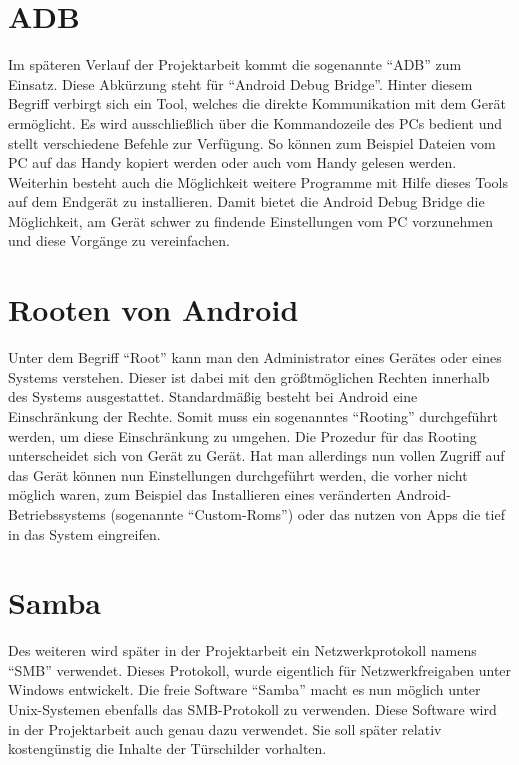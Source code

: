 \begin{flushleft}
\section{ADB}
Im späteren Verlauf der Projektarbeit kommt die sogenannte ``ADB'' zum Einsatz. Diese Abkürzung steht für ``Android Debug Bridge''. Hinter diesem Begriff verbirgt sich ein Tool, welches die direkte Kommunikation mit dem Gerät ermöglicht. Es wird ausschließlich über die Kommandozeile des PCs bedient und stellt verschiedene Befehle zur Verfügung. So können zum Beispiel Dateien vom PC auf das Handy kopiert werden oder auch vom Handy gelesen werden. Weiterhin besteht auch die Möglichkeit weitere Programme mit Hilfe dieses Tools auf dem Endgerät zu installieren. Damit bietet die Android Debug Bridge die Möglichkeit, am Gerät schwer zu findende Einstellungen vom PC vorzunehmen und diese Vorgänge zu vereinfachen. 

\section{Rooten von Android} 
Unter dem Begriff ``Root'' kann man den Administrator eines Gerätes oder eines Systems verstehen. Dieser ist dabei mit den größtmöglichen Rechten innerhalb des Systems ausgestattet. Standardmäßig besteht bei Android eine Einschränkung der Rechte. Somit muss ein sogenanntes ``Rooting'' durchgeführt werden, um diese Einschränkung zu umgehen. Die Prozedur für das Rooting unterscheidet sich von Gerät zu Gerät. Hat man allerdings nun vollen Zugriff auf das Gerät können nun Einstellungen durchgeführt werden, die vorher nicht möglich waren, zum Beispiel das Installieren eines veränderten Android-Betriebssystems (sogenannte ``Custom-Roms'') oder das nutzen von Apps die tief in das System eingreifen.

\section{Samba}
Des weiteren wird später in der Projektarbeit ein Netzwerkprotokoll namens ``SMB'' verwendet. Dieses Protokoll, wurde eigentlich für Netzwerkfreigaben unter Windows entwickelt. Die freie Software ``Samba'' macht es nun möglich unter Unix-Systemen ebenfalls das SMB-Protokoll zu verwenden. Diese Software wird in der Projektarbeit auch genau dazu verwendet. Sie soll später relativ kostengünstig die Inhalte der Türschilder vorhalten.
\end{flushleft}

